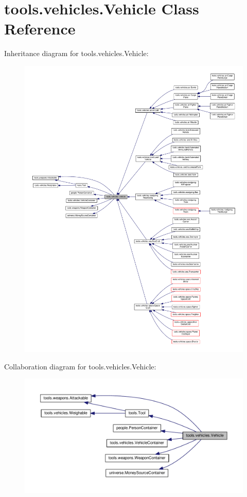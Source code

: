 \hypertarget{classtools_1_1vehicles_1_1_vehicle}{}\section{tools.\+vehicles.\+Vehicle Class Reference}
\label{classtools_1_1vehicles_1_1_vehicle}


Inheritance diagram for tools.\+vehicles.\+Vehicle\+:
\nopagebreak
\begin{figure}[H]
\begin{center}
\leavevmode
\includegraphics[width=350pt]{classtools_1_1vehicles_1_1_vehicle__inherit__graph}
\end{center}
\end{figure}


Collaboration diagram for tools.\+vehicles.\+Vehicle\+:
\nopagebreak
\begin{figure}[H]
\begin{center}
\leavevmode
\includegraphics[width=350pt]{classtools_1_1vehicles_1_1_vehicle__coll__graph}
\end{center}
\end{figure}
